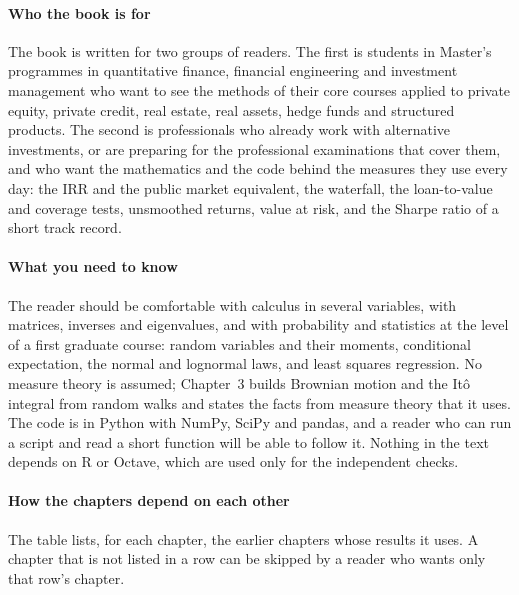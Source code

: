 \paragraph{Who the book is for}
The book is written for two groups of readers. The first is students in Master's programmes in
quantitative finance, financial engineering and investment management who want to see the methods of
their core courses applied to private equity, private credit, real estate, real assets, hedge funds and
structured products. The second is professionals who already work with alternative investments, or are
preparing for the professional examinations that cover them, and who want the mathematics and the code
behind the measures they use every day: the IRR and the public market equivalent, the waterfall, the
loan-to-value and coverage tests, unsmoothed returns, value at risk, and the Sharpe ratio of a short
track record.

\paragraph{What you need to know}
The reader should be comfortable with calculus in several variables, with matrices, inverses and
eigenvalues, and with probability and statistics at the level of a first graduate course: random
variables and their moments, conditional expectation, the normal and lognormal laws, and least squares
regression. No measure theory is assumed; Chapter~3 builds Brownian motion and the It\^o integral from
random walks and states the facts from measure theory that it uses. The code is in Python with NumPy,
SciPy and pandas, and a reader who can run a script and read a short function will be able to follow it.
Nothing in the text depends on R or Octave, which are used only for the independent checks.

\paragraph{How the chapters depend on each other}
The table lists, for each chapter, the earlier chapters whose results it uses. A chapter that is not
listed in a row can be skipped by a reader who wants only that row's chapter.

